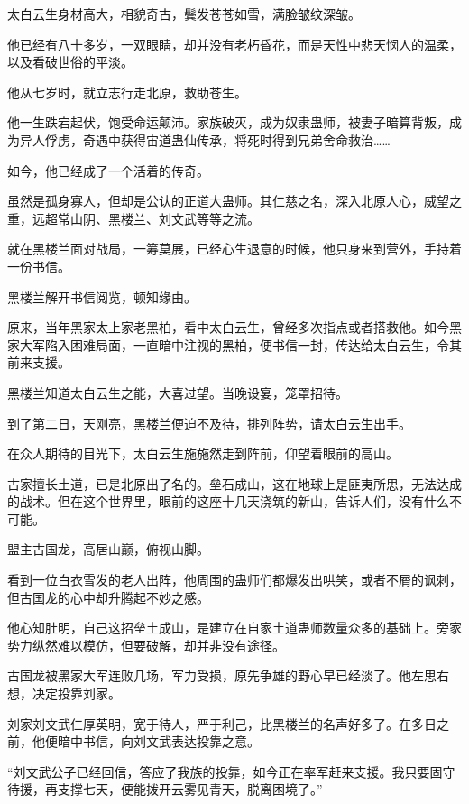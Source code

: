 
\begin{this_body}

太白云生身材高大，相貌奇古，鬓发苍苍如雪，满脸皱纹深皱。

他已经有八十多岁，一双眼睛，却并没有老朽昏花，而是天性中悲天悯人的温柔，以及看破世俗的平淡。

他从七岁时，就立志行走北原，救助苍生。

他一生跌宕起伏，饱受命运颠沛。家族破灭，成为奴隶蛊师，被妻子暗算背叛，成为异人俘虏，奇遇中获得宙道蛊仙传承，将死时得到兄弟舍命救治……

如今，他已经成了一个活着的传奇。

虽然是孤身寡人，但却是公认的正道大蛊师。其仁慈之名，深入北原人心，威望之重，远超常山阴、黑楼兰、刘文武等等之流。

就在黑楼兰面对战局，一筹莫展，已经心生退意的时候，他只身来到营外，手持着一份书信。

黑楼兰解开书信阅览，顿知缘由。

原来，当年黑家太上家老黑柏，看中太白云生，曾经多次指点或者搭救他。如今黑家大军陷入困难局面，一直暗中注视的黑柏，便书信一封，传达给太白云生，令其前来支援。

黑楼兰知道太白云生之能，大喜过望。当晚设宴，笼罩招待。

到了第二日，天刚亮，黑楼兰便迫不及待，排列阵势，请太白云生出手。

在众人期待的目光下，太白云生施施然走到阵前，仰望着眼前的高山。

古家擅长土道，已是北原出了名的。垒石成山，这在地球上是匪夷所思，无法达成的战术。但在这个世界里，眼前的这座十几天浇筑的新山，告诉人们，没有什么不可能。

盟主古国龙，高居山巅，俯视山脚。

看到一位白衣雪发的老人出阵，他周围的蛊师们都爆发出哄笑，或者不屑的讽刺，但古国龙的心中却升腾起不妙之感。

他心知肚明，自己这招垒土成山，是建立在自家土道蛊师数量众多的基础上。旁家势力纵然难以模仿，但要破解，却并非没有途径。

古国龙被黑家大军连败几场，军力受损，原先争雄的野心早已经淡了。他左思右想，决定投靠刘家。

刘家刘文武仁厚英明，宽于待人，严于利己，比黑楼兰的名声好多了。在多日之前，他便暗中书信，向刘文武表达投靠之意。

“刘文武公子已经回信，答应了我族的投靠，如今正在率军赶来支援。我只要固守待援，再支撑七天，便能拨开云雾见青天，脱离困境了。”


\end{this_body}
